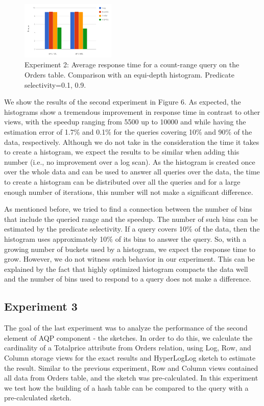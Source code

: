 \documentclass[10pt, conference, compsocconf]{IEEEtran}
\begin{document}
\begin{figure} \includegraphics[width=0.4\textwidth, center]{img/exp2.png} 
\caption{Experiment 2: Average response time for a count-range query on the Orders table. Comparison with an equi-depth histogram. Predicate selectivity=0.1, 0.9.}
\end{figure}

We show the results of the second experiment in Figure 6. As expected, the histograms show a tremendous improvement in response time in contrast to other views, with the speedup ranging from 5500 up to 10000 and while having the estimation error of 1.7\% and 0.1\% for the queries covering 10\% and 90\% of the data, respectively. Although we do not take in the consideration the time it takes to create a histogram, we expect the results to be similar when adding this number (i.e., no improvement over a log scan). As the histogram is created once over the whole data and can be used to answer all queries over the data, the time to create a histogram can be distributed over all the queries and for a large enough number of iterations, this number will not make a significant difference.

As mentioned before, we tried to find a connection between the number of bins that include the queried range and the speedup. The number of such bins can be estimated by the predicate selectivity. If a query covers 10\% of the data, then the histogram uses approximately 10\% of its bins to answer the query. So, with a growing number of buckets used by a histogram, we expect the response time to grow. However, we do not witness such behavior in our experiment. This can be explained by the fact that highly optimized histogram compacts the data well and the number of bins used to respond to a query does not make a difference.

\subsection{Experiment 3}
The goal of the last experiment was to analyze the performance of the second element of AQP component - the sketches. In order to do this, we calculate the cardinality of a Totalprice attribute from Orders relation, using Log, Row, and Column storage views for the exact results and HyperLogLog sketch to estimate the result. Similar to the previous experiment, Row and Column views contained all data from Orders table, and the sketch was pre-calculated. In this experiment we test how the building of a hash table can be compared to the query with a pre-calculated sketch.
\end{document}
